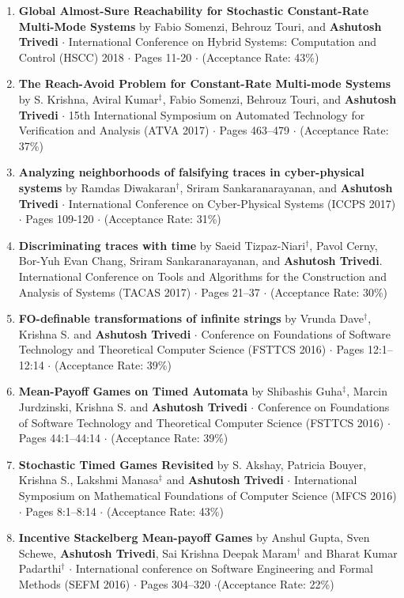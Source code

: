 \documentclass{article}
\begin{document}
\begin{enumerate}
\item
  {\bf Global Almost-Sure Reachability for Stochastic Constant-Rate Multi-Mode
    Systems} by Fabio Somenzi, Behrouz Touri, and {\bf Ashutosh Trivedi} $\cdot$
    International Conference on Hybrid Systems: Computation and Control (HSCC)
    2018 $\cdot$ Pages 11-20 $\cdot$  (Acceptance Rate: 43\%)
\item
  {\bf The Reach-Avoid Problem for Constant-Rate Multi-mode Systems} by S.
  Krishna, Aviral Kumar${}^{\ddag}$, Fabio Somenzi, Behrouz Touri, and {\bf Ashutosh
  Trivedi} $\cdot$ 15th International Symposium on Automated Technology for 
  Verification and Analysis (ATVA 2017) $\cdot$ Pages 463--479 $\cdot$ (Acceptance Rate: 37\%)
\item
  {\bf Analyzing neighborhoods of falsifying traces in cyber-physical systems}
  by Ramdas Diwakaran${}^{\dag}$, Sriram Sankaranarayanan, and {\bf Ashutosh Trivedi} $\cdot$
  International Conference on Cyber-Physical Systems (ICCPS 2017) $\cdot$ Pages
  109-120 $\cdot$ (Acceptance Rate: 31\%)
\item
  {\bf Discriminating traces with time} by
  Saeid Tizpaz-Niari${}^{\dag}$, Pavol Cerny, Bor-Yuh Evan Chang, Sriram Sankaranarayanan,
  and {\bf Ashutosh Trivedi}. International Conference on Tools and Algorithms for the
  Construction and Analysis of Systems (TACAS 2017) $\cdot$ Pages 21--37 $\cdot$
  (Acceptance Rate: 30\%)
\item
  {\bf FO-definable transformations of infinite strings} by 
  Vrunda Dave${}^{\dag}$, Krishna S. and {\bf Ashutosh Trivedi} $\cdot$ 
  Conference on Foundations of Software Technology and Theoretical Computer
  Science (FSTTCS 2016) $\cdot$ Pages 12:1--12:14 $\cdot$ (Acceptance Rate: 39\%)
\item
  {\bf Mean-Payoff Games on Timed Automata} by 
  Shibashis Guha${}^{\ddag}$, Marcin Jurdzinski, Krishna S. and {\bf Ashutosh Trivedi} $\cdot$ 
  Conference on Foundations of Software Technology and Theoretical Computer
  Science (FSTTCS 2016) $\cdot$ Pages 44:1--44:14 $\cdot$ (Acceptance Rate: 39\%)

\item
  {\bf Stochastic Timed Games Revisited} by
  S. Akshay, Patricia Bouyer, Krishna S., Lakshmi Manasa${}^{\ddag}$ and {\bf Ashutosh Trivedi} $\cdot$
  International Symposium on Mathematical Foundations of Computer Science
  (MFCS 2016) $\cdot$ Pages 8:1--8:14  $\cdot$ (Acceptance Rate: 43\%)
\item
  {\bf Incentive Stackelberg Mean-payoff Games} by
  Anshul Gupta, Sven Schewe, {\bf Ashutosh Trivedi}, Sai Krishna Deepak Maram${}^{\dag}$ and
  Bharat Kumar Padarthi${}^{\dag}$ $\cdot$ International conference on
  Software Engineering and Formal Methods (SEFM 2016) $\cdot$ Pages 304--320 $\cdot$(Acceptance Rate:
  22\%) 
  

\end{enumerate}
\end{document}
